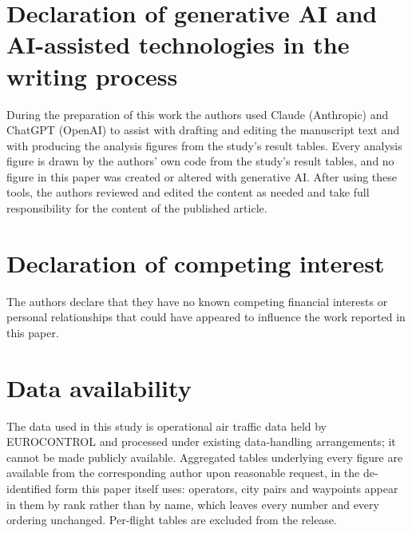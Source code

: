 \documentclass[preprint,authoryear,12pt]{elsarticle}
\begin{document}
\section*{Declaration of generative AI and AI-assisted technologies in
the writing process}
During the preparation of this work the authors used Claude
(Anthropic) and ChatGPT (OpenAI) to assist with drafting and editing the manuscript text
and with producing the analysis figures from the study's result
tables. Every analysis figure is drawn by the authors' own code from
the study's result tables, and no figure in this paper was created or
altered with generative AI. After using these tools, the authors
reviewed and edited the content as needed and take full responsibility
for the content of the published article.

\section*{Declaration of competing interest}
The authors declare that they have no known competing financial
interests or personal relationships that could have appeared to
influence the work reported in this paper.

\section*{Data availability}
The data used in this study is operational air traffic data held by
EUROCONTROL and processed under existing data-handling arrangements; it
cannot be made publicly available. Aggregated tables underlying every
figure are available from the corresponding author upon reasonable
request, in the de-identified form this paper itself uses: operators,
city pairs and waypoints appear in them by rank rather than by name,
which leaves every number and every ordering unchanged. Per-flight tables are excluded from the release.



\end{document}
